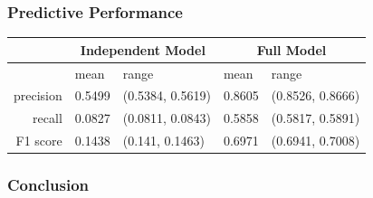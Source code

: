 \documentclass[handout]{beamer}
\begin{document}
\begin{frame} \frametitle{Predictive Performance}

\begin{tabular}{rllll}
\hline \hline
& \multicolumn{2}{c}{Independent Model} & \multicolumn{2}{c}{Full Model} \\
  \hline
 & mean & range & mean & range \\ 
  \hline
precision & 0.5499 & (0.5384, 0.5619) & 0.8605 & (0.8526, 0.8666) \\ 
  recall & 0.0827 & (0.0811, 0.0843) & 0.5858 & (0.5817, 0.5891) \\ 
  F1 score & 0.1438 & (0.141, 0.1463) & 0.6971 & (0.6941, 0.7008) \\ 
   \hline \hline
\end{tabular}

\end{frame}

\begin{frame} \frametitle{Conclusion}

\end{frame}
\end{document}
